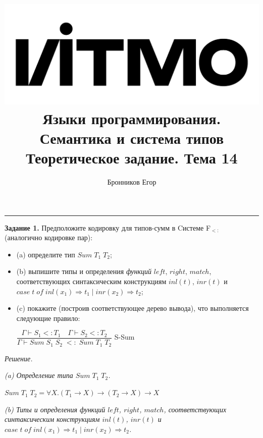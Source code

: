\documentclass[landscape, 11pt]{report}
\title{
	\includegraphics[scale=0.07]{logo}\\
	\vspace{0.5em}
	Языки программирования. Семантика и система типов\\
	\vspace{0.2em}
	\Large Теоретическое задание. Тема 14
}
\author{Бронников Егор}
\date{}
\begin{document}
	
	
	\maketitle
	
	\vspace{-0.5cm}
	\hrule
	\vspace{0.5cm}
	
	
	\textbf{Задание 1.} Предположите кодировку для типов-сумм в Cистеме F$_{<:}$ (аналогично кодировке пар):
	
	\begin{itemize}
		\item[] (a) определите тип $Sum \; T_1 \; T_2$;
		\item[] (b) выпишите типы и определения \textit{функций} $left$, $right$, $match$, соответствующих синтаксическим конструкциям $inl(t)$, $inr(t)$ и $case \; t \; of \; inl(x_1) \Rightarrow t_1 \; | \; inr(x_2) \Rightarrow t_2$;
		\item[] (c) покажите (построив соответствующее дерево вывода), что выполняется следующие правило:
		\begin{center}
			$\dfrac{\Gamma \vdash S_1 <: T_1 \quad \Gamma \vdash S_2 <: T_2}{\Gamma \vdash Sum \; S_1 \; S_2 \; <: \; Sum \; T_1 \; T_2}$ S-Sum
		\end{center}
	\end{itemize}
	
	\vspace{0.2cm}
	
	\textit{Решение.}
	
	\vspace{0.2cm}
	
	\textit{(a) Определение типа $Sum \; T_1 \; T_2$.}
	
	\vspace{0.2cm}
	
	$Sum \; T_1 \; T_2 = \forall X . (T_1 \rightarrow X) \rightarrow (T_2 \rightarrow X) \rightarrow X$
	
	\vspace{0.2cm}
	
	\textit{(b) Типы и определения \textit{функций} $left$, $right$, $match$, соответствующих синтаксическим конструкциям $inl(t)$, $inr(t)$ и \newline $case \; t \; of \; inl(x_1) \Rightarrow t_1 \; | \; inr(x_2) \Rightarrow t_2$.}
	
	\vspace{0.2cm}
	
\end{document}
